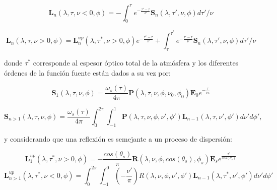         \begin{equation}
        \textbf{L}_{n}(\lambda,\tau,\nu<0,\phi) = 
        -\int_{0}^{\tau}e^{-\frac{\tau'-\tau}{\nu}}\textbf{S}_{n}(\lambda,\tau', 
        \nu,\phi)d\tau'/\nu
        \label{lenoble21a}
        \end{equation}
        
        \begin{equation}
        \textbf{L}_{n}(\lambda,\tau,\nu>0,\phi)= 
        \textbf{L}_{n}^{up}(\lambda,\tau^{*},\nu>0,\phi)e^{-\frac{\tau^{*}-\tau}{\nu}}+\int_{\tau}^{\tau^
        {*}}e^{-\frac{\tau'-\tau}{\nu}}\textbf{S}_{n}(\lambda,\tau', \nu, \phi)d\tau'/\nu
        \label{lenoble21b}
        \end{equation}
        
        \noindent donde $\tau^{*}$ corresponde al espesor óptico total de la atmósfera y los diferentes órdenes de la función fuente están dados a su vez  por:
        
        \begin{equation}
        \textbf{S}_{1}(\lambda,\tau,\nu,\phi) = \frac{\omega_{s}(\tau)}{4 \pi} 
        \textbf{P}(\lambda,\tau,\nu,\phi,\nu_{0},\phi_{0})  \textbf{E}_{0} e^{-\frac{\tau}{\nu_0}} 
        \label{sos:eq:lenoble21c}
        \end{equation}
        
        
        \begin{equation}
        \textbf{S}_{n>1}(\lambda,\tau,\nu,\phi)= \frac{\omega_{s}(\tau)}{4 \pi} \int_{0}^{2\pi} 
        \int_{-1}^{1} \textbf{P}(\lambda,\tau,\nu,\phi,\nu',\phi') \textbf{L}_{n-1}(\lambda,\tau,\nu',\phi')d\nu'd\phi',
        \label{sos:eq:lenoble21d}
        \end{equation}
        
        \noindent y considerando que una reflexión es semejante a un proceso de dispersión:
        
        
        \begin{equation}
        \textbf{L}_{1}^{up}(\lambda,\tau^{*},\nu>0,\phi) = -\frac{cos(\theta_{s})}{\pi} 
        \textbf{R}(\lambda,\nu,\phi,cos(\theta_{s}),\phi_{s}) \textbf{E}_{s}  e^{\frac{\tau^{*}}{cos(\theta_{s})}} 
        \label{sos:eq:lenoble21e}
        \end{equation}
        \begin{equation}
        \textbf{L}_{n>1}^{up}(\lambda,\tau^{*},\nu<0,\phi)= \int_{0}^{2\pi} \int_{-1}^{0} 
        (-\frac{\nu'}{\pi}) R(\lambda,\nu,\phi,\nu',\phi') 
        \textbf{L}_{n-1}(\lambda,\tau^{*},\nu',\phi')d\nu'd\phi'
        \label{sos:eq:lenoble21f}
        \end{equation}
        
